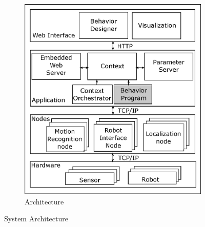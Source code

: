 \documentclass{llncs}
\begin{document}
\begin{figure}
\begin{subfigure}[t]{0.48\textwidth}
\includegraphics[width=\textwidth]{../thesis/assets/architecture.eps}
\caption[System Architecture]{Architecture}
\end{subfigure}
\caption[System Architecture]{System Architecture}
\label{fig:architecture}
\end{figure}
\end{document}

